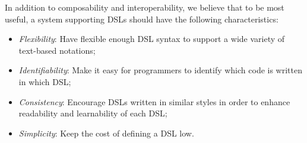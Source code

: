 In addition to composability and interoperability, we believe that to be most useful, a system supporting DSLs should have the following characteristics:

\begin{itemize}

\item \emph{Flexibility}: Have flexible enough DSL syntax to support a wide variety of text-based notations;

\item \emph{Identifiability}: Make it easy for programmers to identify which code is written in which DSL;

\item \emph{Consistency}: Encourage DSLs written in similar styles in order to enhance readability and learnability of each DSL;

\item \emph{Simplicity}: Keep the cost of defining a DSL low.
 
 

\end{itemize}

